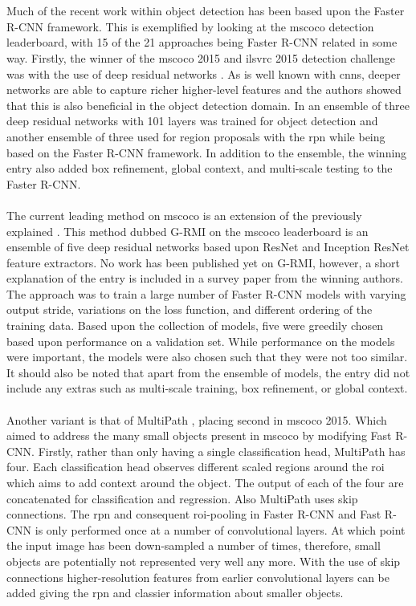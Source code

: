 \\\\
Much of the recent work within object detection has been based upon the Faster R-CNN framework. This is exemplified by looking at the \gls{mscoco} detection leaderboard, with 15 of the 21 approaches being Faster R-CNN related in some way. Firstly, the winner of the \gls{mscoco} 2015 and \gls{ilsvrc} 2015 detection challenge was with the use of deep residual networks \cite{deepres}. As is well known with \glspl{cnn}, deeper networks are able to capture richer higher-level features and the authors showed that this is also beneficial in the object detection domain. In \cite{deepres} an ensemble of three deep residual networks with 101 layers was trained for object detection and another ensemble of three used for region proposals with the \gls{rpn} while being based on the Faster R-CNN framework. In addition to the ensemble, the winning entry also added box refinement, global context, and multi-scale testing to the Faster R-CNN.
\\\\
The current leading method on \gls{mscoco} is an extension of the previously explained \cite{deepres}. This method dubbed G-RMI on the \gls{mscoco} leaderboard \cite{cocolead} is an ensemble of five deep residual networks based upon ResNet \cite{deepres} and Inception ResNet \cite{incepres} feature extractors. No work has been published yet on G-RMI, however, a short explanation of the entry is included in a survey paper \cite{speedacc} from the winning authors. The approach was to train a large number of Faster R-CNN models with varying output stride, variations on the loss function, and different ordering of the training data. Based upon the collection of models, five were greedily chosen based upon performance on a validation set. While performance on the models were important, the models were also chosen such that they were not too similar. It should also be noted that apart from the ensemble of models, the entry did not include any extras such as multi-scale training, box refinement, or global context.
\\\\
Another variant is that of MultiPath \cite{multipath}, placing second in \gls{mscoco} 2015. Which aimed to address the many small objects present in \gls{mscoco} by modifying Fast R-CNN. Firstly, rather than only having a single classification head, MultiPath has four. Each classification head observes different scaled regions around the \gls{roi} which aims to add context around the object. The output of each of the four are concatenated for classification and regression. Also MultiPath uses skip connections. The \gls{rpn} and consequent \gls{roi}-pooling in Faster R-CNN and Fast R-CNN is only performed once at a number of convolutional layers. At which point the input image has been down-sampled a number of times, therefore, small objects are potentially not represented very well any more. With the use of skip connections higher-resolution features from earlier convolutional layers can be added giving the \gls{rpn} and classier information about smaller objects.
